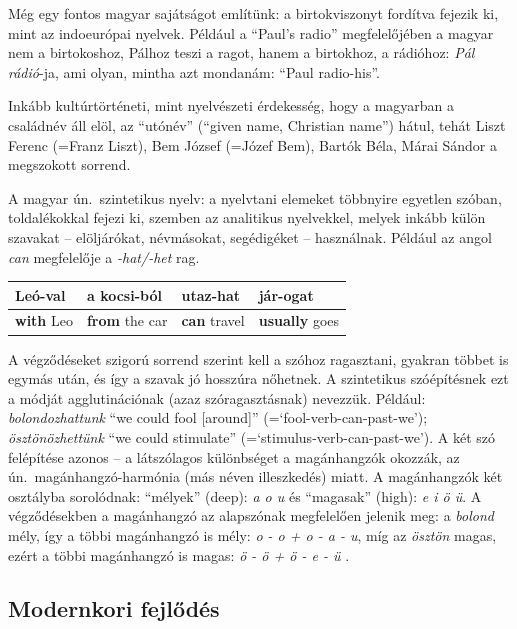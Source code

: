 \begin{multicols}{2}
  Még egy fontos magyar sajátságot említünk: a birtokviszonyt for\-dít\-va fejezik ki, mint az indoeurópai nyelvek. Például a "`Paul's radio"' meg\-fe\-le\-lő\-jé\-ben a magyar nem a birtokoshoz, Pálhoz teszi a ragot, hanem a birtokhoz, a rádióhoz: \textit{Pál rádió}-ja, ami olyan, mintha azt mondanám: "`Paul radio-his"'.

  Inkább kultúrtörténeti, mint nyelvészeti érdekesség, hogy a magyarban a családnév áll elöl, az "`utónév"' ("`given name, Christian name"') hátul, tehát Liszt Ferenc (=Franz Liszt), Bem József (=Józef Bem), Bartók Béla, Márai Sándor a megszokott sorrend.

  A magyar ún.\ szintetikus nyelv: a nyelvtani elemeket többnyire egyetlen szóban, toldalékokkal fejezi ki, szemben az analitikus nyelvekkel, melyek inkább külön szavakat -- elöljárókat, névmásokat, segédigéket -- használnak. Például az angol \textit{can} megfelelője a \textit{-hat/-het} rag.

  \vspace{3mm} 

  \begin{tabular}{l|l|l|l}
      Leó-\textbf{val} & a kocsi-\textbf{ból} & utaz-\textbf{hat} & jár-\textbf{ogat}\\
      \hline
      \textbf{with} Leo & \textbf{from} the car & \textbf{can} travel & \textbf{usually} goes \\
    \end{tabular}

  \vspace{3mm} 

  A végződéseket szigorú sorrend szerint kell a szóhoz ragasztani, gyakran többet is egymás után, és így a szavak jó hosszúra nőhetnek. A szintetikus szóépítésnek ezt a módját agglutinációnak (azaz szóragasztásnak) nevezzük. Például: \textit{bolondozhattunk} "`we could fool [around]"' (=`fool-verb-can-past-we'); \textit{ösztönözhettünk} "`we could stimulate"' (=`stimulus-verb-can-past-we'). A két szó felépítése azonos -- a látszólagos különbséget a magánhangzók okozzák, az ún.\ magánhangzó-harmónia (más néven illeszkedés) miatt. A magánhangzók két osztályba sorolódnak: "`mélyek"' (deep): \textit{a o u} és "`magasak"' (high): \textit{e i ö ü}. A végződésekben a magánhangzó az alapszónak megfelelően jelenik meg: a \textit{bolond} mély, így a többi magánhangzó is mély: \textit{o - o + o - a - u}, míg az \textit{ösztön} magas, ezért a többi magánhangzó is magas: \textit{ö - ö + ö - e - ü} \cite{didyouknow1}.

  \subsection{Modernkori fejlődés}


\end{multicols}
